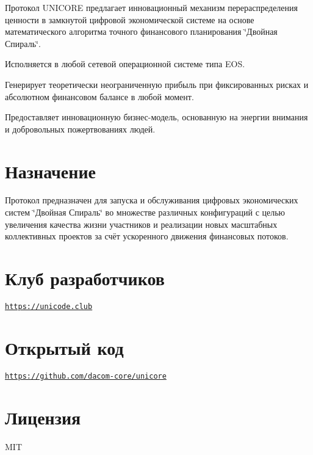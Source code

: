 Протокол U\+N\+I\+C\+O\+RE предлагает инновационный механизм перераспределения ценности в замкнутой цифровой экономической системе на основе математического алгоритма точного финансового планирования \char`\"{}Двойная Спираль\char`\"{}.


\begin{DoxyItemize}
\item Исполняется в любой сетевой операционной системе типа E\+OS.
\item Генерирует теоретически неограниченную прибыль при фиксированных рисках и абсолютном финансовом балансе в любой момент.
\item Предоставляет инновационную бизнес-\/модель, основанную на энергии внимания и добровольных пожертвованиях людей.
\end{DoxyItemize}\hypertarget{index_purpose_sec}{}\section{Назначение}\label{index_purpose_sec}
Протокол предназначен для запуска и обслуживания цифровых экономических систем \char`\"{}Двойная Спираль\char`\"{} во множестве различных конфигураций с целью увеличения качества жизни участников и реализации новых масштабных коллективных проектов за счёт ускоренного движения финансовых потоков. \hypertarget{index_install_sec}{}\section{Клуб разработчиков}\label{index_install_sec}
\href{https://unicode.club}{\tt https\+://unicode.\+club} \hypertarget{index_club_sec}{}\section{Открытый код}\label{index_club_sec}
\href{https://github.com/dacom-core/unicore}{\tt https\+://github.\+com/dacom-\/core/unicore} \hypertarget{index_licension_sec}{}\section{Лицензия}\label{index_licension_sec}
M\+IT 